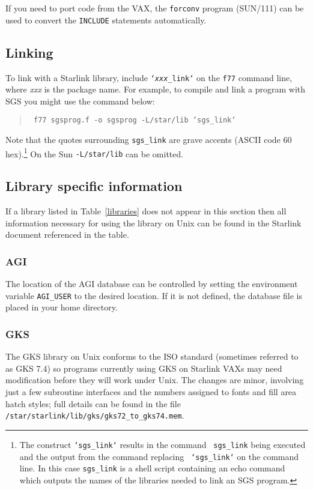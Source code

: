 If you need to port code from the VAX, the {\tt forconv} program (SUN/111)
can be used to convert the {\tt INCLUDE} statements automatically.

\subsection{Linking}

To link with a Starlink library, include {\tt `{\em xxx}\_link`} on
the {\tt f77} command line, where {\em xxx} is the package name. For example,
to compile and link a program with SGS you might use the command below:
\begin{quote}\tt
f77 sgsprog.f -o sgsprog -L/star/lib `sgs\_link`
\end{quote}
Note that the quotes surrounding {\tt sgs\_link} are grave accents (ASCII code
60 hex).\footnote{The construct {\tt `sgs\_link`} results in the command {\tt
sgs\_link} being executed and the output from the command replacing {\tt
`sgs\_link`} on the command line. In this case {\tt sgs\_link} is a shell script
containing an echo command which outputs the names of the libraries needed to
link an SGS program.} On the Sun {\tt -L/star/lib} can be omitted.

\subsection{Library specific information}

If a library listed in
Table~\ref{libraries} does not appear in this section then all information
necessary for using the library on Unix can be found in the Starlink document
referenced in the table.

\subsubsection{AGI}

The location of the AGI database can be controlled by setting the environment
variable {\tt AGI\_USER} to the desired location. If it is not defined, the
database file is placed in your home directory.

\subsubsection{GKS}
The GKS library on Unix conforms to the ISO standard (sometimes referred to
as  GKS 7.4) so programs currently using GKS on Starlink VAXs may need
modification before they will work under Unix. The changes are minor, involving
just a few subroutine interfaces and the numbers assigned to fonts and fill
area hatch styles; full details can be found in the file {\tt
/star\-/starlink\-/lib\-/gks\-/gks72\_to\_gks74.mem}.

